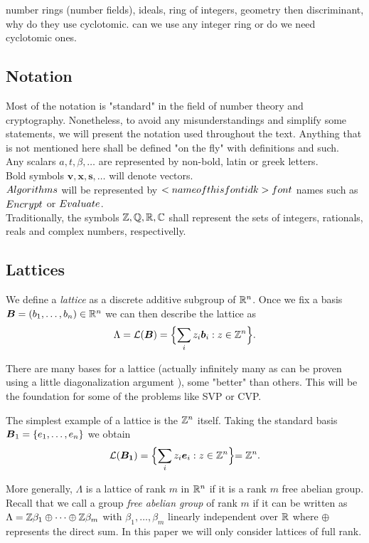 number rings (number fields), ideals, ring of integers, geometry then discriminant, why do they use cyclotomic. can we use any integer ring or do we need cyclotomic ones.

\subsection{Notation}
Most of the notation is "standard" in the field of number theory and cryptography. Nonetheless, to avoid any misunderstandings and simplify some statements, we will present the notation used throughout the text. Anything that is not mentioned here shall be defined "on the fly" with definitions and such. \\
Any scalars $a, t, \beta, \dots$ are represented by non-bold, latin or greek letters.\\
Bold symbols $\bm{v}, \bm{x}, \bm{s}, \dots$ will denote vectors. \\
$Algorithms$ will be represented by $<name of this font idk> font$ names such as $Encrypt$ or $Evaluate$.\\
Traditionally, the symbols $\mathbb{Z}, \mathbb{Q}, \mathbb{R}, \mathbb{C}$ shall represent the sets of integers, rationals, reals and complex numbers, respectivelly.

\subsection{Lattices}
We define a \textit{lattice} as a discrete additive subgroup of $\mathbb{R}^n$. Once we fix a basis $\boldsymbol{B} = (b_1, \dots ,b_n) \in \mathbb{R}^n$ we can then describe the lattice as
$$ \Lambda = \mathcal{L}(\boldsymbol{B}) = \Bigl\{ \sum_i z_i \boldsymbol{b}_i : z \in \mathbb{Z}^n \Bigl\}.$$

There are many bases for a lattice (actually infinitely many as can be proven using a little diagonalization argument ), some "better" than others. This will be the foundation for some of the problems like SVP or CVP.

\begin{example}
    The simplest example of a lattice is the $\mathbb{Z}^n$ itself. Taking the standard basis $\boldsymbol{B}_1 = \{e_1, \dots, e_n\}$ we obtain
    $$\mathcal{L}(\boldsymbol{B_1}) = \Bigl\{ \sum_i z_i \boldsymbol{e}_i : z \in \mathbb{Z}^n \Bigl\} = \mathbb{Z}^n.$$
\end{example}
More generally, $\Lambda$ is a lattice of rank $m$ in $\mathbb{R}^n$ if it is a rank $m$ free abelian group. Recall that we call a group \textit{free abelian group} of rank $m$ if it can be written as $\Lambda = \mathbb{Z}\beta_1 \oplus \cdots \oplus\mathbb{Z}\beta_m$ with $\beta_1, \dots, \beta_m$ linearly independent over $\mathbb{R}$ where $\oplus$ represents the direct sum. In this paper we will only consider lattices of full rank. 

